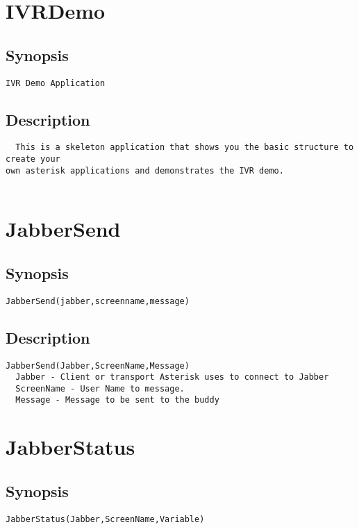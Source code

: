\section{IVRDemo}
\subsection{Synopsis}
\begin{verbatim}
IVR Demo Application
\end{verbatim}
\subsection{Description}
\begin{verbatim}
  This is a skeleton application that shows you the basic structure to create your
own asterisk applications and demonstrates the IVR demo.
 
\end{verbatim}


\section{JabberSend}
\subsection{Synopsis}
\begin{verbatim}
JabberSend(jabber,screenname,message)
\end{verbatim}
\subsection{Description}
\begin{verbatim}
JabberSend(Jabber,ScreenName,Message)
  Jabber - Client or transport Asterisk uses to connect to Jabber
  ScreenName - User Name to message.
  Message - Message to be sent to the buddy

\end{verbatim}


\section{JabberStatus}
\subsection{Synopsis}
\begin{verbatim}
JabberStatus(Jabber,ScreenName,Variable)
\end{verbatim}
